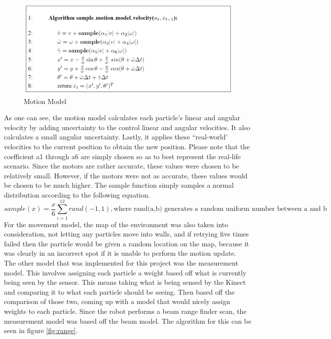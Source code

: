 \documentclass{article}
\newcommand\tab[1][0.5cm]{\hspace*{#1}}
\begin{document}
\begin{figure}[h!]
\centering
\includegraphics[scale=0.75]{motion_algorithm.PNG}
\caption{Motion Model}
\label{fig:motion}
\end{figure}

As one can see, the motion model calculates each particle's linear and angular velocity by adding uncertainty to the control linear and angular velocities\citep{ProbRob}. It also calculates a small angular uncertainty. Lastly, it applies these “real-world’ velocities to the current position to obtain the new position. Please note that the coefficient a1 through a6 are simply chosen so as to best represent the real-life scenario. Since the motors are rather accurate, these values were chosen to be relatively small. However, if the motors were not as accurate, these values would be chosen to be much higher. The sample function simply samples a normal distribution according to the following equation.
\[sample(x) = \frac{x}{6}\sum_{i=1}^{12} rand(-1,1),\textrm{where rand(a,b) generates a random uniform number between a and b} \]
\tab For the movement model, the map of the environment was also taken into consideration, not letting any particles move into walls, and if retrying five times failed then the particle would be given a random location on the map, because it was clearly in an incorrect spot if it is unable to perform the motion update.\\

The other model that was implemented for this project was the measurement model. This involves assigning each particle a weight based off what is currently being seen by the sensor. This means taking what is being sensed by the Kinect and comparing it to what each particle should be seeing. Then based off the comparison of those two, coming up with a model that would nicely assign weights to each particle. Since the robot performs a beam range finder scan, the measurement model was based off the beam model. The algorithm for this can be seen in figure \ref{fig:range}.\\
\end{document}
